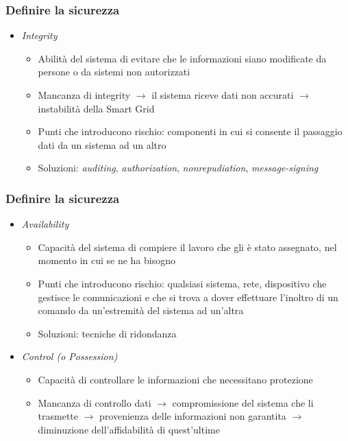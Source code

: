 \begin{frame}
  \frametitle{Definire la sicurezza}
  \begin{itemize}[<+- | alert@+>]
  \item \textit{Integrity}
  	\begin{itemize}
  	\item Abilità del sistema di evitare che le informazioni siano modificate da persone o da sistemi non autorizzati
  	\item Mancanza di integrity $\rightarrow$ il sistema riceve dati non accurati $\rightarrow$ instabilità della Smart Grid
  	\item Punti che introducono rischio: componenti in cui si consente il passaggio dati da un sistema ad un altro
  	\item Soluzioni: \textit{auditing}, \textit{authorization}, \textit{nonrepudiation}, \textit{message-signing}
  	\end{itemize}
  \end{itemize}
\end{frame}

\begin{frame}
  \frametitle{Definire la sicurezza}
  \begin{itemize}[<+- | alert@+>]
  \item \textit{Availability}
  	\begin{itemize}
  	\item Capacità del sistema di compiere il lavoro che gli è stato assegnato, nel momento in cui se ne ha bisogno 
  	\item Punti che introducono rischio: qualsiasi sistema, rete, dispositivo che gestisce le comunicazioni e che si trova a dover effettuare l'inoltro di un comando da un’estremità del sistema ad un’altra
  	\item Soluzioni: tecniche di ridondanza
  	\end{itemize}
  \item \textit{Control (o Possession)}
  	\begin{itemize}
  	\item Capacità di controllare le informazioni che necessitano protezione
  	\item Mancanza di controllo dati $\rightarrow$  compromissione del sistema che li trasmette $\rightarrow$ provenienza delle informazioni non garantita $\rightarrow$ diminuzione dell'affidabilità di quest'ultime
  	\end{itemize}
  \end{itemize}
\end{frame}

